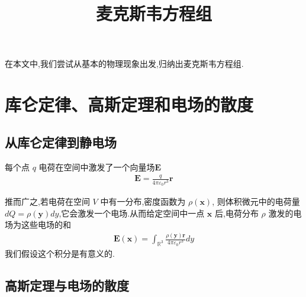 \documentclass{article}
\begin{document}
\begin{CJK}{UTF8}{gbsn}

\title{麦克斯韦方程组}
\maketitle

在本文中,我们尝试从基本的物理现象出发,归纳出麦克斯韦方程组.

\section{库仑定律、高斯定理和电场的散度}
\subsection{从库仑定律到静电场}


\iffalse
带电质点间存在着相互作用,作用的规律被总结为一条经验公式,库仑定律:
\begin{align*}
	\textbf{F}=\frac{qq'}{4\pi\varepsilon_{0} r^3}\textbf{r}
\end{align*}
 其中 $\textbf{F}$ 是作用力的大小, $q,q'$ 是两质点所带电荷, $\textbf{r}$ 是由 $q$ 指向 $q'$ 的矢量, $\varepsilon_0$ 是真空介电常量.

我们换一个视角理解这个公式:
\fi 


每个点 $q$ 电荷在空间中激发了一个向量场$\textbf{E}$
\begin{align*}
	\textbf{E}=\frac{q}{4\pi\varepsilon_{0} r^3}\textbf{r}
\end{align*}

\iffalse
使得一个电荷 $q'$在相对 $q$ 的位矢为$\textbf{r}$时,受力为$\textbf{F}=\textbf{E}q'$. 

在带电粒子相互作用的层面上,这两种理解等价.但向量场 $\textbf{E}$ 是单个电荷的内禀属性,无关于相互作用,在物理上是更加深刻的.我们称之为静电场.

很自然地,静电场从库仑定律处继承了力的所有叠加法则.数个电荷在某一点激发的电场为它们分别激发电场的和.
\fi

推而广之,若电荷在空间 $V$ 中有一分布,密度函数为 $\rho(\textbf{x})$, 则体积微元中的电荷量 $dQ=\rho(\textbf{y})dy$,它会激发一个电场.从而给定空间中一点 $\textbf{x}$ 后,电荷分布 $\rho$ 激发的电场为这些电场的和
\begin{align*}
	\textbf{E}(\textbf{x})=\int_{\mathbb{R}^3}\frac{\rho(\textbf{y})\textbf{r}}{4\pi\varepsilon_0 r^3}dy 
\end{align*}
我们假设这个积分是有意义的.

\subsection{高斯定理与电场的散度}


\end{CJK}
\end{document}
